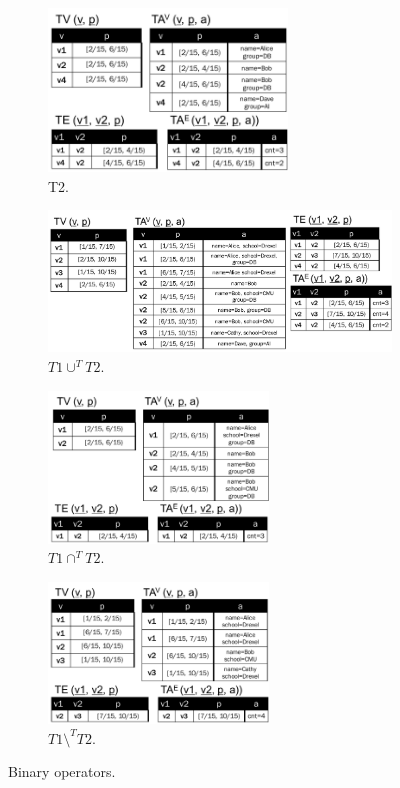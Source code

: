 \begin{figure}
\begin{subfigure}{2.5in}
\includegraphics[width=2.5in]{figs/T2_rel.pdf}
\caption{T2.}
\label{fig:tg_t2}
\end{subfigure}
\begin{subfigure}{4.3in}
\includegraphics[width=4.3in]{figs/T1_union_T2_rel.pdf}
\caption{$T1 \cup^T T2.$}
\label{fig:tg_union}
\end{subfigure}
\begin{subfigure}{2.3in}
\includegraphics[width=2.3in]{figs/T1_inter_T2_rel.pdf}
\caption{$T1 \cap^T T2$.}
\vspace{-0.2cm}
\label{fig:tg_inter}
\end{subfigure}
\begin{subfigure}{2.3in}
\includegraphics[width=2.3in]{figs/T1_diff_T2_rel.pdf}
\caption{$T1 \setminus^T T2$.}
\vspace{-0.2cm}
\label{fig:tg_diff}
\end{subfigure}
\caption{Binary operators.}
\label{fig:binary}
\vspace{-0.2cm}
\end{figure}

